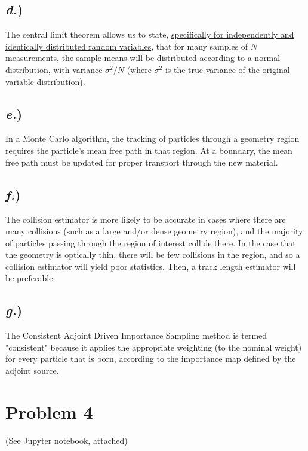 \documentclass{article}
\begin{document}
\subsection*{\textit{d.})}
The central limit theorem allows us to state, \underline{specifically for independently and identically distributed random variables}, that for many samples of $N$ measurements, the sample means will be distributed according to a normal distribution, with variance $\sigma^2/N$ (where $\sigma^2$ is the true variance of the original variable distribution).

\subsection*{\textit{e.})}
In a Monte Carlo algorithm, the tracking of particles through a geometry region requires the particle's mean free path in that region. At a boundary, the mean free path must be updated for proper transport through the new material. 

\subsection*{\textit{f.})}
The collision estimator is more likely to be accurate in cases where there are many collisions (such as a large and/or dense geometry region), and the majority of particles passing through the region of interest collide there. In the case that the geometry is optically thin, there will be few collisions in the region, and so a collision estimator will yield poor statistics. Then, a track length estimator will be preferable.

\subsection*{\textit{g.})}
The Consistent Adjoint Driven Importance Sampling method is termed "consistent" because it applies the appropriate weighting (to the nominal weight) for every particle that is born, according to the importance map defined by the adjoint source.




\section*{Problem 4}

(See Jupyter notebook, attached)






\end{document}
